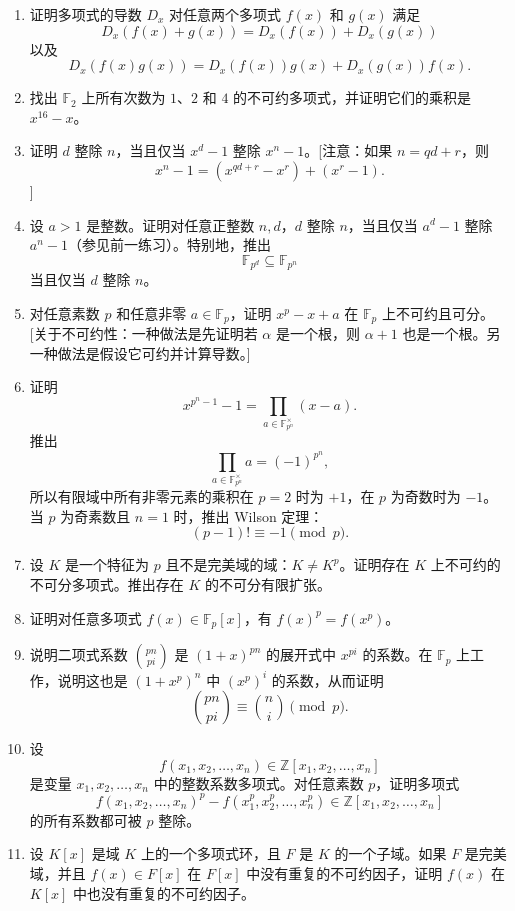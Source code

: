 \begin{enumerate}[label=\arabic*.]
	\item 证明多项式的导数 $D_x$ 对任意两个多项式 $f(x)$ 和 $g(x)$ 满足
	\[
	D_x(f(x)+g(x))=D_x(f(x))+D_x(g(x))
	\]
	以及
	\[
	D_x(f(x)g(x))=D_x(f(x))g(x)+D_x(g(x))f(x).
	\]
	
	\item 找出 $\mathbb F_2$ 上所有次数为 $1$、$2$ 和 $4$ 的不可约多项式，并证明它们的乘积是 $x^{16}-x$。
	
	\item 证明 $d$ 整除 $n$，当且仅当 $x^d-1$ 整除 $x^n-1$。[注意：如果 $n=qd+r$，则
	\[
	x^n-1=(x^{qd+r}-x^r)+(x^r-1).
	\]]
	
	\item 设 $a>1$ 是整数。证明对任意正整数 $n,d$，$d$ 整除 $n$，当且仅当 $a^d-1$ 整除 $a^n-1$（参见前一练习）。特别地，推出
	\[
	\mathbb F_{p^d}\subseteq\mathbb F_{p^n}
	\]
	当且仅当 $d$ 整除 $n$。
	
	\item 对任意素数 $p$ 和任意非零 $a\in\mathbb F_p$，证明 $x^p-x+a$ 在 $\mathbb F_p$ 上不可约且可分。[关于不可约性：一种做法是先证明若 $\alpha$ 是一个根，则 $\alpha+1$ 也是一个根。另一种做法是假设它可约并计算导数。]
	
	\item 证明
	\[
	x^{p^n-1}-1=\prod_{a\in\mathbb F_{p^n}^{\times}}(x-a).
	\]
	推出
	\[
	\prod_{a\in\mathbb F_{p^n}^{\times}}a=(-1)^{p^n},
	\]
	所以有限域中所有非零元素的乘积在 $p=2$ 时为 $+1$，在 $p$ 为奇数时为 $-1$。当 $p$ 为奇素数且 $n=1$ 时，推出 Wilson 定理：
	\[
	(p-1)!\equiv -1\pmod p.
	\]
	
	\item 设 $K$ 是一个特征为 $p$ 且不是完美域的域：$K\neq K^p$。证明存在 $K$ 上不可约的不可分多项式。推出存在 $K$ 的不可分有限扩张。
	
	\item 证明对任意多项式 $f(x)\in\mathbb F_p[x]$，有 $f(x)^p=f(x^p)$。
	
	\item 说明二项式系数 $\binom{pn}{pi}$ 是 $(1+x)^{pn}$ 的展开式中 $x^{pi}$ 的系数。在 $\mathbb F_p$ 上工作，说明这也是 $(1+x^p)^n$ 中 $(x^p)^i$ 的系数，从而证明
	\[
	\binom{pn}{pi}\equiv \binom ni \pmod p.
	\]
	
	\item 设
	\[
	f(x_1,x_2,\ldots,x_n)\in\mathbb Z[x_1,x_2,\ldots,x_n]
	\]
	是变量 $x_1,x_2,\ldots,x_n$ 中的整数系数多项式。对任意素数 $p$，证明多项式
	\[
	f(x_1,x_2,\ldots,x_n)^p-f(x_1^p,x_2^p,\ldots,x_n^p)
	\in\mathbb Z[x_1,x_2,\ldots,x_n]
	\]
	的所有系数都可被 $p$ 整除。
	
	\item 设 $K[x]$ 是域 $K$ 上的一个多项式环，且 $F$ 是 $K$ 的一个子域。如果 $F$ 是完美域，并且 $f(x)\in F[x]$ 在 $F[x]$ 中没有重复的不可约因子，证明 $f(x)$ 在 $K[x]$ 中也没有重复的不可约因子。
\end{enumerate}
